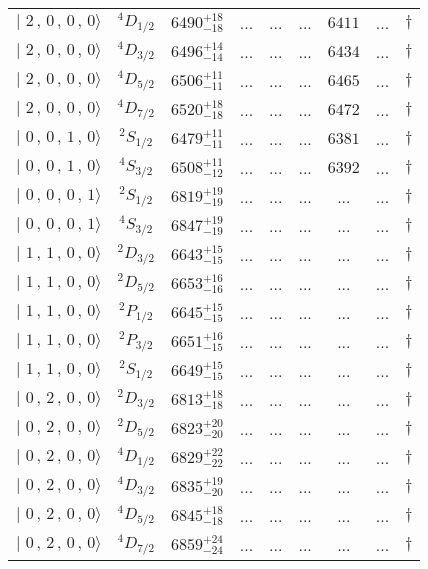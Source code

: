 \begin{tabular}{c c| c c c c c c c}
$\vert \,\,2\,,\,0\,,\,0\,,\,0 \rangle $ & $^{4}D_{1/2}$ & $6490^{+18}_{-18}$ & ... & ... & ... & $6411$ & ... & $\dagger$ \\ 
$\vert \,\,2\,,\,0\,,\,0\,,\,0 \rangle $ & $^{4}D_{3/2}$ & $6496^{+14}_{-14}$ & ... & ... & ... & $6434$ & ... & $\dagger$ \\ 
$\vert \,\,2\,,\,0\,,\,0\,,\,0 \rangle $ & $^{4}D_{5/2}$ & $6506^{+11}_{-11}$ & ... & ... & ... & $6465$ & ... & $\dagger$ \\ 
$\vert \,\,2\,,\,0\,,\,0\,,\,0 \rangle $ & $^{4}D_{7/2}$ & $6520^{+18}_{-18}$ & ... & ... & ... & $6472$ & ... & $\dagger$ \\ 
$\vert \,\,0\,,\,0\,,\,1\,,\,0 \rangle $ & $^{2}S_{1/2}$ & $6479^{+11}_{-11}$ & ... & ... & ... & $6381$ & ... & $\dagger$ \\ 
$\vert \,\,0\,,\,0\,,\,1\,,\,0 \rangle $ & $^{4}S_{3/2}$ & $6508^{+11}_{-12}$ & ... & ... & ... & $6392$ & ... & $\dagger$ \\ 
$\vert \,\,0\,,\,0\,,\,0\,,\,1 \rangle $ & $^{2}S_{1/2}$ & $6819^{+19}_{-19}$ & ... & ... & ... & ... & ... & $\dagger$ \\ 
$\vert \,\,0\,,\,0\,,\,0\,,\,1 \rangle $ & $^{4}S_{3/2}$ & $6847^{+19}_{-19}$ & ... & ... & ... & ... & ... & $\dagger$ \\ 
$\vert \,\,1\,,\,1\,,\,0\,,\,0 \rangle $ & $^{2}D_{3/2}$ & $6643^{+15}_{-15}$ & ... & ... & ... & ... & ... & $\dagger$ \\ 
$\vert \,\,1\,,\,1\,,\,0\,,\,0 \rangle $ & $^{2}D_{5/2}$ & $6653^{+16}_{-16}$ & ... & ... & ... & ... & ... & $\dagger$ \\ 
$\vert \,\,1\,,\,1\,,\,0\,,\,0 \rangle $ & $^{2}P_{1/2}$ & $6645^{+15}_{-15}$ & ... & ... & ... & ... & ... & $\dagger$ \\ 
$\vert \,\,1\,,\,1\,,\,0\,,\,0 \rangle $ & $^{2}P_{3/2}$ & $6651^{+16}_{-15}$ & ... & ... & ... & ... & ... & $\dagger$ \\ 
$\vert \,\,1\,,\,1\,,\,0\,,\,0 \rangle $ & $^{2}S_{1/2}$ & $6649^{+15}_{-15}$ & ... & ... & ... & ... & ... & $\dagger$ \\ 
$\vert \,\,0\,,\,2\,,\,0\,,\,0 \rangle $ & $^{2}D_{3/2}$ & $6813^{+18}_{-18}$ & ... & ... & ... & ... & ... & $\dagger$ \\ 
$\vert \,\,0\,,\,2\,,\,0\,,\,0 \rangle $ & $^{2}D_{5/2}$ & $6823^{+20}_{-20}$ & ... & ... & ... & ... & ... & $\dagger$ \\ 
$\vert \,\,0\,,\,2\,,\,0\,,\,0 \rangle $ & $^{4}D_{1/2}$ & $6829^{+22}_{-22}$ & ... & ... & ... & ... & ... & $\dagger$ \\ 
$\vert \,\,0\,,\,2\,,\,0\,,\,0 \rangle $ & $^{4}D_{3/2}$ & $6835^{+19}_{-20}$ & ... & ... & ... & ... & ... & $\dagger$ \\ 
$\vert \,\,0\,,\,2\,,\,0\,,\,0 \rangle $ & $^{4}D_{5/2}$ & $6845^{+18}_{-18}$ & ... & ... & ... & ... & ... & $\dagger$ \\ 
$\vert \,\,0\,,\,2\,,\,0\,,\,0 \rangle $ & $^{4}D_{7/2}$ & $6859^{+24}_{-24}$ & ... & ... & ... & ... & ... & $\dagger$ \\ 
\hline \hline
\end{tabular}

